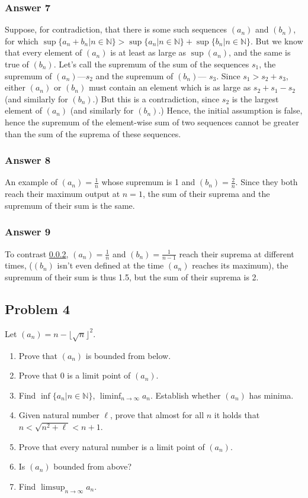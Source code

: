 \documentclass[11pt]{article}
\begin{document}
\subsubsection{Answer 7}
\label{sec-1-3-1}
Suppose, for contradiction, that there is some such sequences $(a_n)$ and
$(b_n)$, for which $\sup \{a_n + b_n | n \in \mathbb{N}\} > \sup \{a_n | n
    \in \mathbb{N}\} + \sup \{b_n | n \in \mathbb{N}\}$.  But we know that every
element of $(a_n)$ is at least as large as $\sup (a_n)$, and the same is
true of $(b_n)$.  Let's call the supremum of the sum of the sequences $s_1$,
the supremum of $(a_n)$---$s_2$ and the supremum of $(b_n)$--- $s_3$.
Since $s_1 > s_2 + s_3$, either $(a_n)$ or $(b_n)$ must contain an element
which is as large as $s_2 + s_1 - s_2$ (and similarly for $(b_n)$.)  But
this is a contradiction, since $s_2$ is the largest element of $(a_n)$
(and similarly for $(b_n)$.)  Hence, the initial assumption is false, hence
the supremum of the element-wise sum of two sequences cannot be greater than
the sum of the suprema of these sequences.
\subsubsection{Answer 8}
\label{sec-1-3-2}
An example of $(a_n) = \frac{1}{n}$ whose supremum is 1 and $(b_n) =
    \frac{2}{n}$.  Since they both reach their maximum output at $n=1$, the sum
of their suprema and the supremum of their sum is the same.
\subsubsection{Answer 9}
\label{sec-1-3-3}
To contrast \ref{sec-1-3-2}, $(a_n) = \frac{1}{n}$ and $(b_n) = \frac{1}{n - 1}$
reach their suprema at different times, ($(b_n)$ isn't even defined at the
time $(a_n)$ reaches its maximum), the supremum of their sum is thus 1.5,
but the sum of their suprema is 2.
\subsection{Problem 4}
\label{sec-1-4}
Let $(a_n) = n - \lfloor \sqrt{n} \rfloor^2$.
\begin{enumerate}
\item Prove that $(a_n)$ is bounded from below.
\item Prove that 0 is a limit point of $(a_n)$.
\item Find $\inf \{a_n | n \in \mathbb{N}\}$, $\liminf_{n \to \infty} a_n$.
Establish whether $(a_n)$ has minima.
\item Given natural number $\ell$, prove that almost for all $n$ it holds
that $n < \sqrt{n^2 + \ell} < n + 1$.
\item Prove that every natural number is a limit point of $(a_n)$.
\item Is $(a_n)$ bounded from above?
\item Find $\limsup_{n \to \infty} a_n$.
\end{enumerate}
\end{document}
